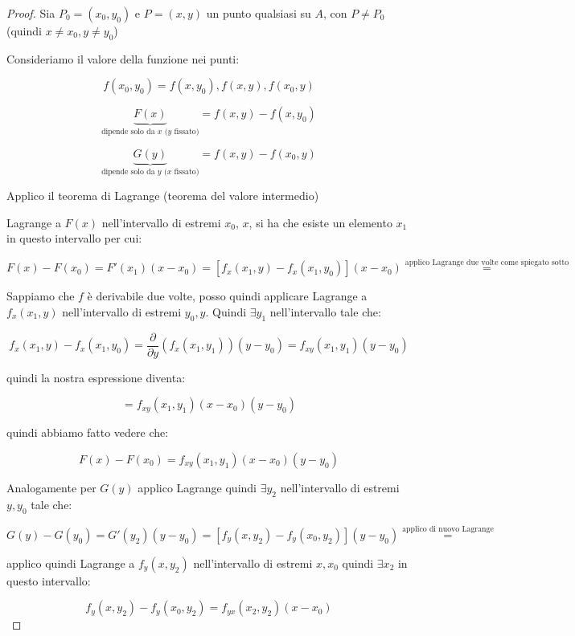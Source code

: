 \documentclass[../appunti-analisi.tex]{subfiles}
\begin{document}
\begin{proof}
       Sia $P_0=(x_0,y_0)$ e $P=(x,y)$ un punto qualsiasi su $A$, con $P \neq P_0$ (quindi $x \neq x_0, y \neq y_0$)

       Consideriamo il valore della funzione nei punti:

       \[
           f(x_0,y_0) = f(x,y_0), f(x,y), f(x_0,y)
       \]

       \[
           \underbrace{F(x)}_\text{dipende solo da $x$ ($y$ fissato)} = f(x,y) - f(x,y_0)
       \]

       \[
           \underbrace{G(y)}_\text{dipende solo da $y$ ($x$ fissato)}  = f(x,y) - f(x_0,y)
       \]

       Applico il teorema di Lagrange (teorema del valore intermedio)

       Lagrange a $F(x)$ nell'intervallo di estremi $x_0$, $x$, si ha che esiste un elemento $x_1$ in questo intervallo per cui:

       \[
           F(x)- F(x_0) = F'(x_1) (x-x_0) = [f_x(x_1,y) - f_x(x_1,y_0) ] (x- x_0)  \overset{\text{applico Lagrange due volte come spiegato sotto}}{=}
       \]

       Sappiamo che $f$ è derivabile due volte, posso quindi applicare Lagrange a $f_x(x_1,y)$ nell'intervallo di estremi $y_0,y$. Quindi $\exists y_1$ nell'intervallo tale che:

       \[
           f_x(x_1,y) - f_x(x_1,y_0) = \frac{\partial }{\partial y}(f_x(x_1,y_1))(y-y_0) = f_{xy}(x_1,y_1)(y-y_0)
       \]

       quindi la nostra espressione diventa:

       \[
           = f_{xy}(x_1,y_1)(x-x_0) (y-y_0)
       \]

       quindi abbiamo fatto vedere che:

       \[
           F(x) -F(x_0) = f_{xy}(x_1,y_1) (x-x_0)(y-y_0)
       \]

       Analogamente per $G(y)$ applico Lagrange quindi $\exists y_2$ nell'intervallo di estremi $y,y_0$ tale che:

       \[
           G(y) -G(y_0) = G'(y_2) (y-y_0) = [f_y(x,y_2) - f_y(x_0,y_2)] (y-y_0) \overset{\text{applico di nuovo Lagrange}}{=}
       \]

       applico quindi Lagrange a $f_y(x,y_2)$ nell'intervallo di estremi $x,x_0$ quindi $\exists x_2$ in questo intervallo:

       \[
           f_y(x,y_2) - f_y(x_0,y_2) = f_{yx}(x_2,y_2)(x-x_0)
       \]


\end{proof}
\end{document}
